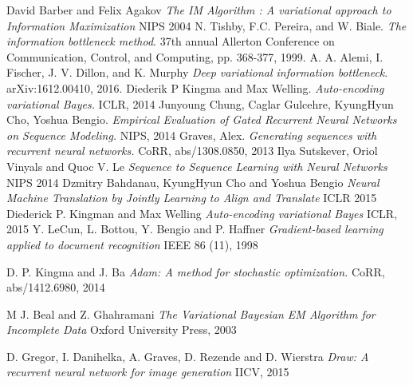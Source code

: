 \documentclass[11pt,oneside,openright]{report}
\begin{document}
\begin{thebibliography}{9} 
David Barber and Felix Agakov
\textit{The IM Algorithm : A variational approach to Information Maximization}
NIPS 2004
N. Tishby, F.C. Pereira, and W. Biale.
\textit{The information bottleneck method}.
37th annual Allerton Conference on Communication, Control, and Computing, pp. 368-377, 1999.
A. A. Alemi, I. Fischer, J. V. Dillon, and K. Murphy
\textit{Deep variational information bottleneck}.
 arXiv:1612.00410, 2016.
 Diederik P Kingma and Max Welling.
 \textit{Auto-encoding variational Bayes.}
  ICLR, 2014
 Junyoung Chung, Caglar Gulcehre, KyungHyun Cho, Yoshua Bengio.
 \textit{Empirical Evaluation of Gated Recurrent Neural Networks on Sequence Modeling.}
  NIPS, 2014
 Graves, Alex.
 \textit{Generating sequences with recurrent neural networks.}
 CoRR, abs/1308.0850, 2013
Ilya Sutskever, Oriol Vinyals and Quoc V. Le
\textit{Sequence to Sequence Learning with Neural Networks}
NIPS 2014
Dzmitry Bahdanau, KyungHyun Cho and Yoshua Bengio
\textit{Neural Machine Translation by Jointly Learning to Align and Translate}
ICLR 2015
Diederick P. Kingman and Max Welling
\textit{Auto-encoding variational Bayes}
ICLR, 2015
Y. LeCun, L. Bottou, Y. Bengio and P. Haffner
\textit{Gradient-based learning applied to document recognition}
IEEE 86 (11), 1998

D. P. Kingma and J. Ba
\textit{Adam: A method for stochastic optimization.}
 CoRR, abs/1412.6980, 2014
 
M J. Beal and Z. Ghahramani
\textit{The Variational Bayesian EM Algorithm for Incomplete Data}
Oxford University Press, 2003

D. Gregor, I. Danihelka, A. Graves, D. Rezende and D. Wierstra
\textit{Draw: A recurrent neural network for image generation}
IICV, 2015
\end{thebibliography}
\end{document}
